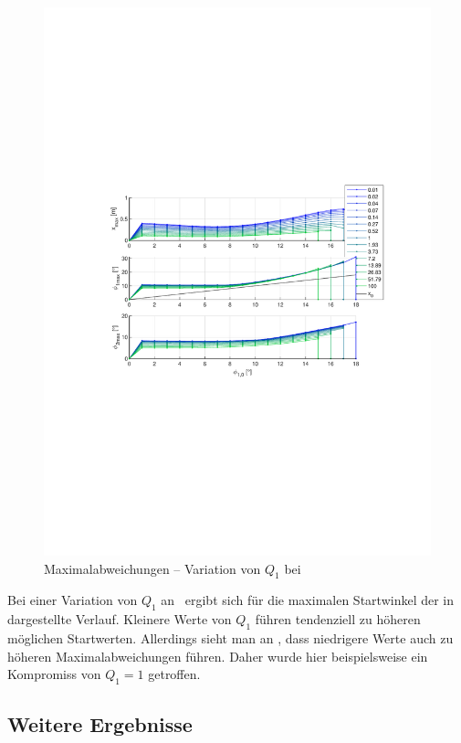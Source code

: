 \begin{figure}[htb]
	\centering
		\includegraphics{Bilder/QRVariation/ap4/q1 phi1 m.pdf}
	\caption{Maximalabweichungen -- Variation von $Q_1$ bei \apv}
	\label{fig:qrap4q1m}
\end{figure}

Bei einer Variation von $Q_1$ an \apv\ ergibt sich für die maximalen Startwinkel der in  dargestellte Verlauf.
Kleinere Werte von $Q_1$ führen tendenziell zu höheren möglichen Startwerten.
Allerdings sieht man an , dass niedrigere Werte auch zu höheren Maximalabweichungen führen.
Daher wurde hier beispielsweise ein Kompromiss von $Q_1=1$ getroffen.


\subsection{Weitere Ergebnisse}

